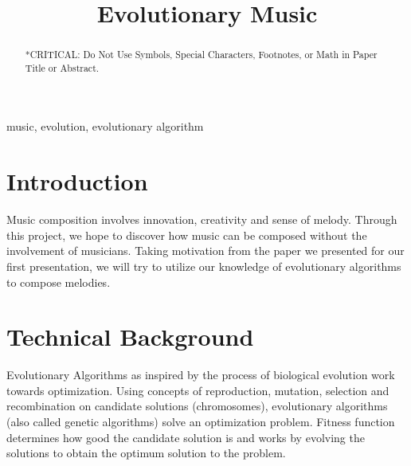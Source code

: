 \documentclass[conference]{IEEEtran}
\begin{document}
\title{Evolutionary Music%
}

\author{
\and
{}
}

\maketitle

\begin{abstract}
*CRITICAL: Do Not Use Symbols, Special Characters, Footnotes, 
or Math in Paper Title or Abstract.
\end{abstract}

\begin{IEEEkeywords}
music, evolution, evolutionary algorithm
\end{IEEEkeywords}

\section{Introduction}
Music composition involves innovation, creativity and sense of melody. Through this project, we hope to discover how music can be composed without the involvement of musicians. Taking motivation from the paper we presented for our first presentation, we will try to utilize our knowledge of evolutionary algorithms to compose melodies.


\section{Technical Background}
Evolutionary Algorithms as inspired by the process of biological evolution work towards optimization. Using concepts of reproduction, mutation, selection and recombination on candidate solutions (chromosomes), evolutionary algorithms (also called genetic algorithms) solve an optimization problem. Fitness function determines how good the candidate solution is and works by evolving the solutions to obtain the optimum solution to the problem.
\end{document}

